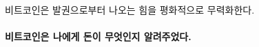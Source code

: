 비트코인은 발권으로부터 나오는 힘을 평화적으로 무력화한다. 



\begin{comment}
	돈은 여러 차례 반복을 거치고 있다. 
	대부분의 반복은 괜찮았다. 어떤 식으로든 개선되었다.
	그러나 최근에 화폐의 내부 작동이 손상되었다.
	오늘날 거의 모든 화폐는 권력에 의해 무에서 유를 창조하고 있다. 
	어떻게 이런 일이 벌어졌는지 이해하기 위해 나는 돈의 역사와 몰락에 대해 배워야 했다.
\end{comment}

\begin{comment}
	이 부패를 바로잡기 위해서 일련의 재앙이 불어닥쳐야할지 아니면 단순히 훌륭한 교육이 필요할지는 아직 미지수이다. 
	하지만 건전 화폐의 신에게 후자이기를 기도해본다.
\end{comment}


\paragraph{비트코인은 나에게 돈이 무엇인지 알려주었다.}

%
%
%
%
